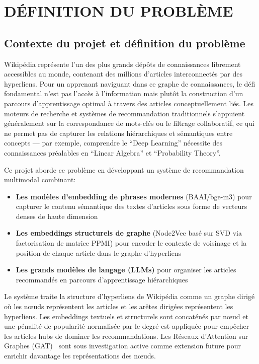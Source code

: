 \chapter{DÉFINITION DU PROBLÈME}
\thispagestyle{empty}

\section{Contexte du projet et définition du problème}

Wikipédia représente l'un des plus grands dépôts de connaissances librement accessibles au monde, contenant des millions d'articles interconnectés par des hyperliens. Pour un apprenant naviguant dans ce graphe de connaissances, le défi fondamental n'est pas l'accès à l'information mais plutôt la construction d'un parcours d'apprentissage optimal à travers des articles conceptuellement liés. Les moteurs de recherche et systèmes de recommandation traditionnels s'appuient généralement sur la correspondance de mots-clés ou le filtrage collaboratif, ce qui ne permet pas de capturer les relations hiérarchiques et sémantiques entre concepts --- par exemple, comprendre le ``Deep Learning'' nécessite des connaissances préalables en ``Linear Algebra'' et ``Probability Theory''.

Ce projet aborde ce problème en développant un système de recommandation multimodal combinant:
\begin{itemize}
    \item \textbf{Les modèles d'embedding de phrases modernes} (BAAI/bge-m3) pour capturer le contenu sémantique des textes d'articles sous forme de vecteurs denses de haute dimension
    \item \textbf{Les embeddings structurels de graphe} (Node2Vec basé sur SVD via factorisation de matrice PPMI) pour encoder le contexte de voisinage et la position de chaque article dans le graphe d'hyperliens
    \item \textbf{Les grands modèles de langage (LLMs)} pour organiser les articles recommandés en parcours d'apprentissage hiérarchiques
\end{itemize}

Le système traite la structure d'hyperliens de Wikipédia comme un graphe dirigé où les nœuds représentent les articles et les arêtes dirigées représentent les hyperliens. Les embeddings textuels et structurels sont concaténés par nœud et une pénalité de popularité normalisée par le degré est appliquée pour empêcher les articles hubs de dominer les recommandations. Les Réseaux d'Attention sur Graphes (GAT)~\cite{velickovic2018graph} sont sous investigation active comme extension future pour enrichir davantage les représentations des nœuds.

